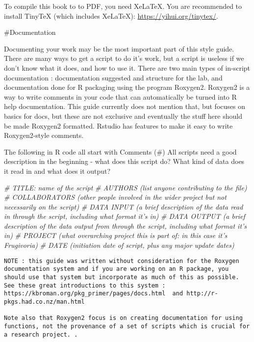\documentclass[
]{article}
\newenvironment{Shaded}{\begin{snugshade}}{\end{snugshade}}
\newcommand{\CommentTok}[1]{\textcolor[rgb]{0.56,0.35,0.01}{\textit{#1}}}
\begin{document}
To compile this book to to PDF, you need XeLaTeX. You are recommended to install TinyTeX (which includes XeLaTeX): \url{https://yihui.org/tinytex/}.

\#Documentation

Documenting your work may be the most important part of this style guide.\\
There are many ways to get a script to do it's work, but a script is useless if we don't know what it does, and how to use it. There are two main types of in-script documentation : documentation suggested and structure for the lab, and documentation done for R packaging using the program Roxygen2. Roxygen2 is a way to write comments in your code that can automatically be turned into R help documentation. This guide currently does not mention that, but focuses on basics for docs, but these are not exclusive and eventually the stuff here should be made Roxygen2 formatted. Rstudio has features to make it easy to write Roxygen2-style comments.

The following in R code all start with Comments (\#)
All scripts need a good description in the beginning - what does this script do? What kind of data does it read in and what does it output?

\begin{Shaded}
\begin{Highlighting}[]
\CommentTok{# TITLE: name of the script}
\CommentTok{# AUTHORS (list anyone contributing to the file)}
\CommentTok{# COLLABORATORS (other people involved in the wider project but not necessarily on the script)}
\CommentTok{# DATA INPUT (a brief description of the data read in through the script, including what format it’s in)}
\CommentTok{# DATA OUTPUT (a brief description of the data output from through the script, including what format it’s in)}
\CommentTok{# PROJECT (what overarching project this is part of: in this case it’s Frugivoria)}
\CommentTok{# DATE (initiation date of script, plus any major update dates)}
\end{Highlighting}
\end{Shaded}

\begin{verbatim}
NOTE : this guide was written without consideration for the Roxygen documentation system and if you are working on an R package, you should use that system but incorporate as much of this as possible.   See these great introductions to this system : https://kbroman.org/pkg_primer/pages/docs.html  and http://r-pkgs.had.co.nz/man.html

Note also that Roxygen2 focus is on creating documentation for using functions, not the provenance of a set of scripts which is crucial for a research project. .   
\end{verbatim}
\end{document}
